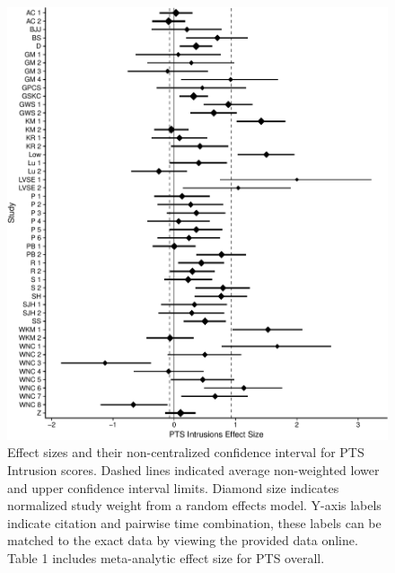 \documentclass[man]{apa6}
\theoremstyle{definition}
\theoremstyle{definition}
\theoremstyle{definition}
\theoremstyle{remark}
\begin{document}
\begin{figure}[htbp]
\centering
\includegraphics{meta_markdown_files/figure-latex/ptspicint-1.pdf}
\caption{\label{fig:ptspicint}Effect sizes and their non-centralized
confidence interval for PTS Intrusion scores. Dashed lines indicated
average non-weighted lower and upper confidence interval limits. Diamond
size indicates normalized study weight from a random effects model.
Y-axis labels indicate citation and pairwise time combination, these
labels can be matched to the exact data by viewing the provided data
online. Table 1 includes meta-analytic effect size for PTS overall.}
\end{figure}
\end{document}
